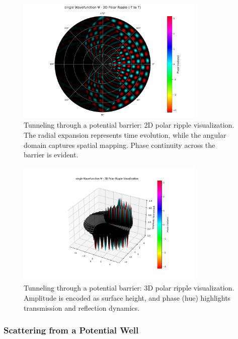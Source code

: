 \documentclass[12pt]{article}
\begin{document}
\begin{figure}[H]
\centering
\includegraphics[width=0.8\textwidth]{images/tunneling_wavefunction_2d_polar_probability_density_with_phase.png}
\caption{Tunneling through a potential barrier: 2D polar ripple visualization. The radial expansion represents time evolution, while the angular domain captures spatial mapping. Phase continuity across the barrier is evident.}
\label{fig:tunneling_2d_polar}
\end{figure}

\begin{figure}[H]
\centering
\includegraphics[width=0.8\textwidth]{images/tunneling_wavefunction_3d_polar_probability_density_with_phase.png}
\caption{Tunneling through a potential barrier: 3D polar ripple visualization. Amplitude is encoded as surface height, and phase (hue) highlights transmission and reflection dynamics.}
\label{fig:tunneling_3d_polar}
\end{figure}

\subsubsection{Scattering from a Potential Well}
\end{document}
